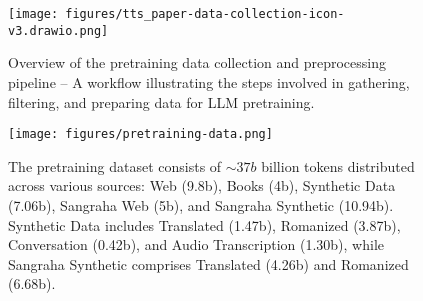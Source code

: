 

\begin{figure*}[h]
    \centering
    \texttt{[image: figures/tts\_paper-data-collection-icon-v3.drawio.png]}
    \vspace{-0.2cm}
    \caption{Overview of the pretraining data collection and preprocessing pipeline -- A workflow illustrating the steps involved in gathering, filtering, and preparing data for LLM pretraining.
    }
    \label{fig:data_collection_final}
    \vspace{-0.3cm}
\end{figure*}


\begin{figure}[t]
  \centering
  \texttt{[image: figures/pretraining-data.png]}
  \vspace{-0.3cm}
  \caption{The pretraining dataset consists of $\sim37b$ billion tokens distributed across various sources: Web (9.8b), Books (4b), Synthetic Data (7.06b), Sangraha Web (5b), and Sangraha Synthetic (10.94b). Synthetic Data includes Translated (1.47b), Romanized (3.87b), Conversation (0.42b), and Audio Transcription (1.30b), while Sangraha Synthetic comprises Translated (4.26b) and Romanized (6.68b).}
  \label{fig:pretraining_data_distribution}
  \vspace{-0.4cm}
\end{figure}






